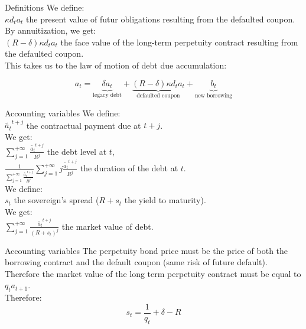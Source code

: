 \documentclass{beamer}
\begin{document}
\begin{frame}{Definitions}
We define:
\\ \smallbreak
\(\kappa d_ta_t\) the present value of futur obligations resulting from the defaulted coupon.
\\ \bigbreak
By annuitization, we get:
\\ \smallbreak
\((R-\delta)\kappa d_ta_t\) the face value of the long-term perpetuity contract resulting from the defaulted coupon.
\\ \bigbreak
This takes us to the law of motion of debt due accumulation:

\[
  a_t
  = \underbrace{\delta a_t}_\text{legacy debt}
  + \underbrace{(R-\delta)\kappa d_t a_t}_\text{defaulted coupon}
  + \underbrace{b_t}_\text{new borrowing}
  \]

\end{frame}

\begin{frame}{Accounting variables}
We define:
\\ \smallbreak
\(\tilde{a_t}^{t+j}\) the contractual payment due at \(t+j\).
\\ \bigbreak
We get:
\\ \smallbreak
\(\sum_{j=1}^{+\infty} \frac{\tilde{a_t}^{t+j}}{R^j}\) the debt level at \(t\),
\\ \smallbreak
\(\frac{1}{\sum_{j=1}^{+\infty} \frac{\tilde{a_t}^{t+j}}{R^j}}\sum_{j=1}^{+\infty} j\frac{\tilde{a_t}^{t+j}}{R^j}\) the duration of the debt at \(t\).
\\ \bigbreak
We define:
\\ \smallbreak \(s_t\) the sovereign's spread (\(R+s_t\) the yield to maturity).
\\ \bigbreak
We get:
\\ \smallbreak
\(\sum_{j=1}^{+\infty} \frac{\tilde{a_t}^{t+j}}{(R+s_t)^j}\) the market value of debt.
\end{frame}

\begin{frame}{Accounting variables}
The perpetuity bond price must be the price of both the borrowing contract and the default coupon (same risk of future default).
\\ \bigbreak
Therefore the market value of the long term perpetuity contract must be equal to \(q_ta_{t+1}\).
\\ \bigbreak
Therefore:
\[s_t=\frac{1}{q_t}+\delta-R\]

\end{frame}
\end{document}
